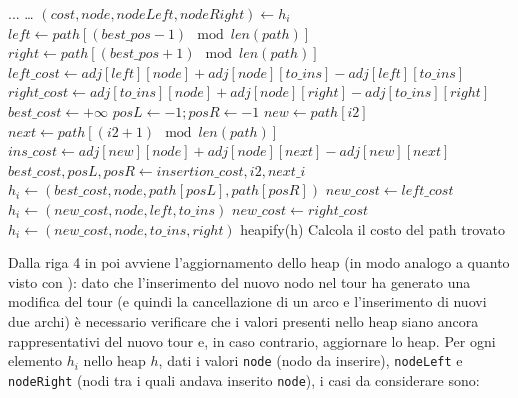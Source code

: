 \documentclass[a4paper,12pt]{report}
\begin{document}
\begin{tcolorbox}[colframe=black, colback=white, boxrule=0.5pt, title=Cheapest Insertion Versione 2, coltitle=black, fonttitle=\bfseries, colbacktitle=white, breakable]
  \begin{algorithmic}[1]
    \State ...
      \State \dots
        \State $(cost, node, nodeLeft, nodeRight) \gets h_i$
        \State $left \gets path[(best\_pos - 1) \mod len(path)]$
        \State $right \gets path[(best\_pos + 1) \mod len(path)]$
        \State $left\_cost \gets adj[left][node] + adj[node][to\_ins] - adj[left][to\_ins]$
        \State $right\_cost \gets adj[to\_ins][node] + adj[node][right] - adj[to\_ins][right]$
          \State $best\_cost \gets +\infty$
          \State $posL \gets -1; posR \gets -1$
            \State $new \gets path[i2]$
            \State $next \gets path[(i2 + 1) \mod len(path)]$
            \State $ins\_cost \gets adj[new][node] + adj[node][next] - adj[new][next]$
              \State $best\_cost, posL, posR \gets insertion\_cost, i2, next\_i$
            \EndIf
          \EndFor
          \State $h_i \gets (best\_cost, node, path[posL], path[posR])$
        \EndIf
          \State $new\_cost \gets left\_cost$
          \State $h_i \gets (new\_cost, node, left, to\_ins)$
        \EndIf
          \State $new\_cost \gets right\_cost$
          \State $h_i \gets (new\_cost, node, to\_ins, right)$
        \EndIf
      \EndFor
      \State heapify(h)
    \EndWhile
    \State Calcola il costo del path trovato
  \end{algorithmic}
\end{tcolorbox}
Dalla riga 4 in poi avviene l'aggiornamento dello heap (in modo analogo a quanto visto con ): dato che l'inserimento del nuovo nodo nel tour ha generato una modifica del tour (e quindi la cancellazione di un arco e l'inserimento di nuovi due archi) è necessario verificare che i valori presenti nello heap siano ancora rappresentativi del nuovo tour e, in caso contrario, aggiornare lo heap. Per ogni elemento $h_i$ nello heap $h$, dati i valori \lstinline!node! (nodo da inserire), \lstinline!nodeLeft! e \lstinline!nodeRight! (nodi tra i quali andava inserito \lstinline!node!), i casi da considerare sono:
\end{document}
